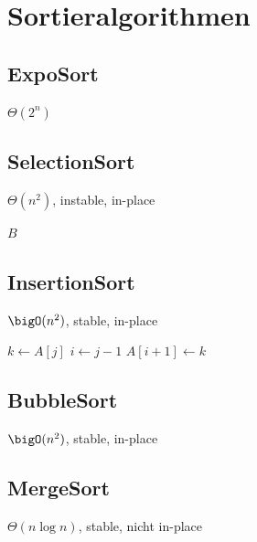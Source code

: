 \section*{Sortieralgorithmen}

\subsection*{ExpoSort}
$\Theta(2^n)$

\begin{algorithm}[H]
\end{algorithm}

\subsection*{SelectionSort}
$\Theta(n^2)$, instable, in-place

\begin{algorithm}[H]
	\KwRet $B$\;
\end{algorithm}

\subsection*{InsertionSort}
$\bigO(n^2)$, stable, in-place

\begin{algorithm}[H]
	 {
		$k \gets A[j]$\;
		$i \gets j-1$\;
		$A[i+1] \gets k$\;
	}
\end{algorithm}

\subsection*{BubbleSort}
$\bigO(n^2)$, stable, in-place

\begin{algorithm}[H]
\end{algorithm}

\subsection*{MergeSort}
$\Theta(n\log n)$, stable, nicht in-place

